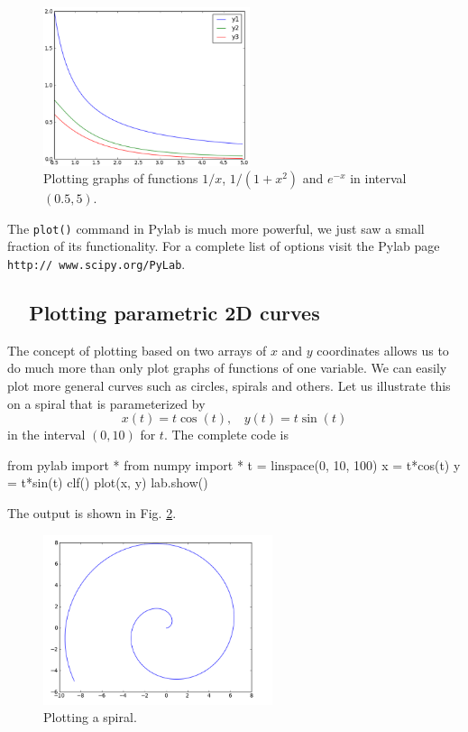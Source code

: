 \begin{figure}[!ht]
\begin{center}
\includegraphics[width=0.54\textwidth]{imgp/plot7.png}
\end{center}
\vspace{-4mm}
\caption{Plotting graphs of functions $1/x$, $1 / (1 + x^2)$ and $e^{-x}$ in interval $(0.5, 5)$.}
\label{fig:plot7}
\vspace{-2mm}
\end{figure}
\noindent
The {\tt plot()} command in Pylab is much more powerful, we just saw a small 
fraction of its functionality. For a complete list of options 
visit the Pylab page {\tt http:// www.scipy.org/PyLab}.

\subsection{\ \ Plotting parametric 2D curves}\label{subsec:planarcurves}

The concept of plotting based on two arrays of $x$ and $y$ coordinates
allows us to do much more than only plot graphs of functions of one variable.
We can easily plot more general curves such as circles, spirals and others.
Let us illustrate this on a spiral that is parameterized 
by 
$$
x(t) = t \cos(t), \ \ \ \ 
y(t) = t \sin(t)
$$ 
in the interval $(0, 10)$ for $t$. The complete code is

\begin{bluecode}
from pylab import *
from numpy import *
t = linspace(0, 10, 100)
x = t*cos(t)
y = t*sin(t)
clf()
plot(x, y)
lab.show()
\end{bluecode}
The output is shown in Fig. \ref{fig:plot6}.

\begin{figure}[!ht]
\begin{center}
\includegraphics[width=0.6\textwidth]{imgp/plot6.png}
\end{center}
\vspace{-6mm}
\caption{Plotting a spiral.}
\label{fig:plot6}
\vspace{-0mm}
\end{figure}
\noindent

